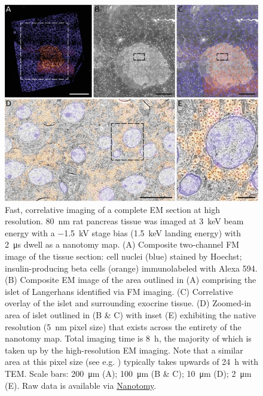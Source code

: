 \begin{figure}[!tb]
    \centering
    \includegraphics[width=\linewidth]{chapter-2/figures_JPEG_LQ/fig2-7_rat.jpg}
    \caption{Fast, correlative imaging of a complete EM section at high resolution. \SI{80}{\nano\meter} rat pancreas tissue was imaged at \SI{3}{\kilo\electronvolt} beam energy with a \SI{-1.5}{\kilo\volt} stage bias (\SI{1.5}{\kilo\electronvolt} landing energy) with \SI{2}{\micro\second} dwell as a nanotomy map. (A) Composite two-channel FM image of the tissue section: cell nuclei (blue) stained by Hoechst; insulin-producing beta cells (orange) immunolabeled with Alexa 594. (B) Composite EM image of the area outlined in (A) comprising the islet of Langerhans identified via FM imaging. (C) Correlative overlay of the islet and surrounding exocrine tissue. (D) Zoomed-in area of islet outlined in (B \& C) with inset (E) exhibiting the native resolution (\SI{5}{\nano\meter} pixel size) that exists across the entirety of the nanotomy map. Total imaging time is \SI{8}{\hour}, the majority of which is taken up by the high-resolution EM imaging. Note that a similar area at this pixel size (see e.g. \textcite{ravelli2013destruction}) typically takes upwards of \SI{24}{\hour} with TEM. Scale bars: \SI{200}{\micro\meter} (A); \SI{100}{\micro\meter} (B \& C); \SI{10}{\micro\meter} (D); \SI{2}{\micro\meter} (E). Raw data is available via \href{www.nanotomy.org}{Nanotomy}.}
    \label{fig:2.7_rat}
\end{figure}


